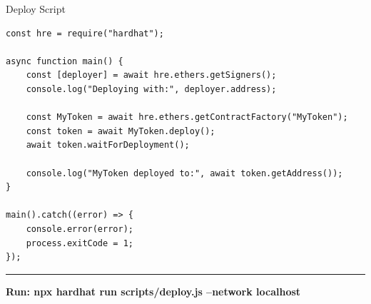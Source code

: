 \documentclass[8pt,aspectratio=169]{beamer}
\newcommand{\bottomnote}[1]{\vfill\vspace{-2mm}\textcolor{mllavender2}{\rule{\textwidth}{0.4pt}}\vspace{1mm}\footnotesize\textbf{#1}}
\begin{document}
\begin{frame}[fragile]{Deploy Script}
\begin{lstlisting}[language={},keywords={const,async,function,await,require,console},keywordstyle=\color{solkeyword}\bfseries,commentstyle=\color{solcomment}\ttfamily,stringstyle=\color{solstring}\ttfamily]
const hre = require("hardhat");

async function main() {
    const [deployer] = await hre.ethers.getSigners();
    console.log("Deploying with:", deployer.address);

    const MyToken = await hre.ethers.getContractFactory("MyToken");
    const token = await MyToken.deploy();
    await token.waitForDeployment();

    console.log("MyToken deployed to:", await token.getAddress());
}

main().catch((error) => {
    console.error(error);
    process.exitCode = 1;
});
\end{lstlisting}
  \bottomnote{Run: npx hardhat run scripts/deploy.js --network localhost}
\end{frame}
\end{document}
